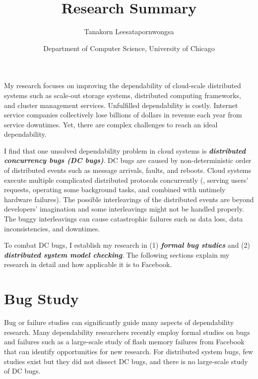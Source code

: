 \documentclass[11pt]{article}
\begin{document}
\title{Research Summary}
\author{Tanakorn Leesatapornwongsa}
\date{\vspace{-1ex} \small{Department of Computer Science, University of
Chicago}}

\maketitle

\vspace{-1ex} 
My research focuses on improving the dependability of cloud-scale distributed
systems such as scale-out storage systems, distributed computing frameworks,
and cluster management services. Unfulfilled dependability is costly. Internet
service companies collectively lose billions of dollars in revenue each year
from service downtimes. Yet, there are complex challenges to reach an ideal
dependability. 

I find that one unsolved dependability problem in cloud systems is
\textbf{\textit{distributed concurrency bugs (DC bugs)}}. DC bugs are caused by
non-deterministic order of distributed events such as message arrivals, faults,
and reboots. Cloud systems execute multiple complicated distributed protocols
concurrently (\eg, serving users' requests, operating some background tasks,
and combined with untimely hardware failures). The possible interleavings of
the distributed events are beyond developers' imagination and some
interleavings might not be handled properly. The buggy interleavings can cause
catastrophic failures such as data loss, data inconsistencies, and downtimes. 

To combat DC bugs, I establish my research in (1) \textbf{\textit{formal bug
studies}} and (2) \textbf{\textit{distributed system model checking}}. The
following sections explain my research in detail and how applicable it is to
Facebook.

\section{Bug Study}

Bug or failure studies can significantly guide many aspects of dependability
research. Many dependability researchers recently employ formal studies on bugs
and failures such as a large-scale study of flash memory failures from Facebook
that can identify opportunities for new research. For distributed system bugs,
few studies exist but they did not dissect DC bugs, and there is no large-scale
study of DC bugs. 
\end{document}
